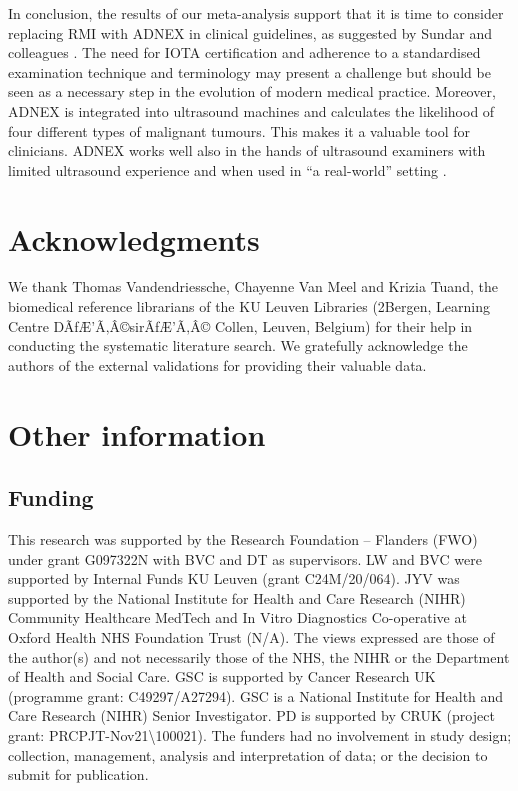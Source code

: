 In conclusion, the results of our meta-analysis support that it is time to consider
replacing \gls{RMI} with \gls{ADNEX} in clinical guidelines, as suggested by Sundar and
colleagues \cite{sundarRiskpredictionModelsPostmenopausal2024}. The need for \gls{IOTA}
certification and adherence to a standardised examination technique and terminology
may present a challenge but should be seen as a necessary step in the evolution of
modern medical practice. Moreover, \gls{ADNEX} is integrated into ultrasound machines and
calculates the likelihood of four different types of malignant tumours. This makes it
a valuable tool for clinicians. \gls{ADNEX} works well also in the hands of ultrasound
examiners with limited ultrasound experience and when used in ``a real-world''
setting
 \cite{sundarRiskpredictionModelsPostmenopausal2024,moroExternalValidationUltrasoundbased2025}.

\section*{Acknowledgments}
We thank Thomas Vandendriessche, Chayenne Van Meel and Krizia Tuand, the biomedical
reference librarians of the KU Leuven Libraries (2Bergen, Learning Centre DÃƒÆ’Ã‚Â©sirÃƒÆ’Ã‚Â©
Collen, Leuven, Belgium) for their help in conducting the systematic literature
search. We gratefully acknowledge the authors of the external validations for
providing their valuable data.

\section*{Other information}
\subsection*{Funding}
This research was supported by the Research Foundation -- Flanders (FWO) under grant
G097322N with BVC and DT as supervisors. LW and BVC were supported by Internal Funds
KU Leuven (grant C24M/20/064). JYV was supported by the National Institute for
Health and Care Research (NIHR) Community Healthcare MedTech and In Vitro Diagnostics
Co-operative at Oxford Health NHS Foundation Trust (N/A). The views expressed are
those of the author(s) and not necessarily those of the NHS, the NIHR or the
Department of Health and Social Care. GSC is supported by Cancer Research UK
(programme grant: C49297/A27294). GSC is a National Institute for Health and Care
Research (NIHR) Senior Investigator. PD is supported by CRUK (project grant:
PRCPJT-Nov21\textbackslash100021). The funders had no involvement in study design;
collection, management, analysis and interpretation of data; or the decision to
submit for publication.

